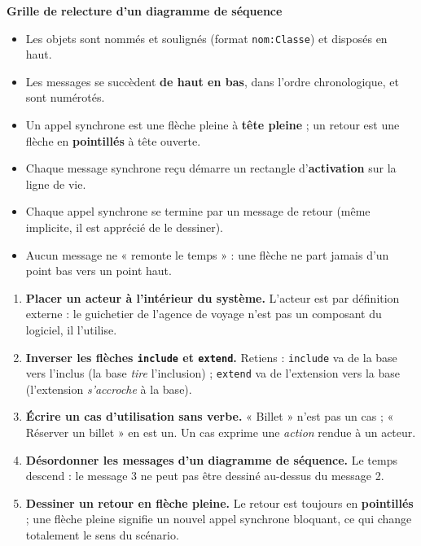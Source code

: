 \documentclass[11pt]{article}
\begin{document}
\textbf{Grille de relecture d'un diagramme de séquence}

\begin{itemize}
\item[$\square$] Les objets sont nommés et soulignés (format \texttt{nom:Classe}) et disposés en haut.
\item[$\square$] Les messages se succèdent \textbf{de haut en bas}, dans l'ordre chronologique, et sont numérotés.
\item[$\square$] Un appel synchrone est une flèche pleine à \textbf{tête pleine} ; un retour est une flèche en \textbf{pointillés} à tête ouverte.
\item[$\square$] Chaque message synchrone reçu démarre un rectangle d'\textbf{activation} sur la ligne de vie.
\item[$\square$] Chaque appel synchrone se termine par un message de retour (même implicite, il est apprécié de le dessiner).
\item[$\square$] Aucun message ne « remonte le temps » : une flèche ne part jamais d'un point bas vers un point haut.
\end{itemize}

\begin{attention}
\begin{enumerate}
\item \textbf{Placer un acteur à l'intérieur du système.} L'acteur est par définition externe : le guichetier de l'agence de voyage n'est pas un composant du logiciel, il l'utilise.
\item \textbf{Inverser les flèches \texttt{include} et \texttt{extend}.} Retiens : \texttt{include} va de la base vers l'inclus (la base \emph{tire} l'inclusion) ; \texttt{extend} va de l'extension vers la base (l'extension \emph{s'accroche} à la base).
\item \textbf{Écrire un cas d'utilisation sans verbe.} « Billet » n'est pas un cas ; « Réserver un billet » en est un. Un cas exprime une \emph{action} rendue à un acteur.
\item \textbf{Désordonner les messages d'un diagramme de séquence.} Le temps descend : le message 3 ne peut pas être dessiné au-dessus du message 2.
\item \textbf{Dessiner un retour en flèche pleine.} Le retour est toujours en \textbf{pointillés} ; une flèche pleine signifie un nouvel appel synchrone bloquant, ce qui change totalement le sens du scénario.
\end{enumerate}
\end{attention}
\end{document}
